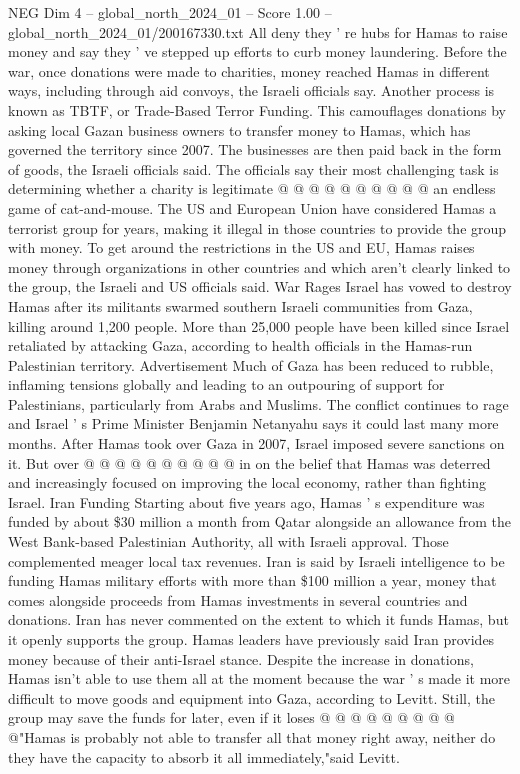 \begin{textsample}{NEG Dim 4 – global\_north\_2024\_01 – Score 1.00 – global\_north\_2024\_01/200167330.txt}
All deny they ' re hubs for Hamas to raise money and say they ' ve stepped up efforts to curb money laundering.
Before the war, once donations were made to charities, money reached Hamas in different ways, including through aid convoys, the Israeli officials say.
Another process is known as TBTF, or Trade-Based Terror Funding.
This camouflages donations by asking local Gazan business owners to transfer money to Hamas, which has governed the territory since 2007.
The businesses are then paid back in the form of goods, the Israeli officials said.
The officials say their most challenging task is determining whether a charity is legitimate @ @ @ @ @ @ @ @ @ @ an endless game of cat-and-mouse.
The US and European Union have considered Hamas a terrorist group for years, making it illegal in those countries to provide the group with money.
To get around the restrictions in the US and EU, Hamas raises money through organizations in other countries and which aren't clearly linked to the group, the Israeli and US officials said.
War Rages Israel has vowed to destroy Hamas after its militants swarmed southern Israeli communities from Gaza, killing around 1,200 people.
More than 25,000 people have been killed since Israel retaliated by attacking Gaza, according to health officials in the Hamas-run Palestinian territory.
Advertisement Much of Gaza has been reduced to rubble, inflaming tensions globally and leading to an outpouring of support for Palestinians, particularly from Arabs and Muslims.
The conflict continues to rage and Israel ' s Prime Minister Benjamin Netanyahu says it could last many more months.
After Hamas took over Gaza in 2007, Israel imposed severe sanctions on it.
But over @ @ @ @ @ @ @ @ @ @ in on the belief that Hamas was deterred and increasingly focused on improving the local economy, rather than fighting Israel.
Iran Funding Starting about five years ago, Hamas ' s expenditure was funded by about \$30 million a month from Qatar alongside an allowance from the West Bank-based Palestinian Authority, all with Israeli approval.
Those complemented meager local tax revenues.
Iran is said by Israeli intelligence to be funding Hamas military efforts with more than \$100 million a year, money that comes alongside proceeds from Hamas investments in several countries and donations.
Iran has never commented on the extent to which it funds Hamas, but it openly supports the group.
Hamas leaders have previously said Iran provides money because of their anti-Israel stance.
Despite the increase in donations, Hamas isn't able to use them all at the moment because the war ' s made it more difficult to move goods and equipment into Gaza, according to Levitt.
Still, the group may save the funds for later, even if it loses @ @ @ @ @ @ @ @ @ @"Hamas is probably not able to transfer all that money right away, neither do they have the capacity to absorb it all immediately,"said Levitt.

\end{textsample}
